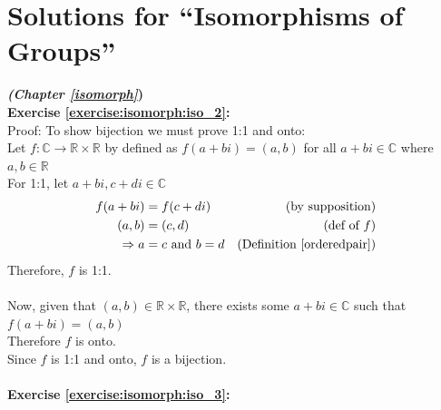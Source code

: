 
\section{Solutions for ``Isomorphisms of Groups''}
\noindent\textbf{\textit{ (Chapter \ref{isomorph}})}\bigskip
\\
\textbf{Exercise \ref{exercise:isomorph:iso_2}:}
\\
Proof: To show bijection we must prove 1:1 and onto:
\\
Let $f : {\mathbb C} \longrightarrow {\mathbb R} \times {\mathbb R}$ by defined as $f(a + bi) = (a,b)$ for all $a +  bi \in {\mathbb C}$ where $a, b \in {\mathbb R}$
\\
For 1:1, let $a + bi, c + di \in {\mathbb C}$
\begin{align*}
f(a + bi) &= f(c + di) &\text{(by supposition)}
\\
(a, b) &= (c, d) &\text{(def of\ } f)
\\
\implies a &= c \text{\ and\ } b = d &(\text{Definition~\ref{orderedpair}})
\end{align*}
Therefore, $f$ is 1:1.
\\
\\
Now, given that $(a, b) \in {\mathbb R} \times {\mathbb R}$, there exists some $a + bi \in {\mathbb C}$ such that $f(a + bi) = (a, b)$
\\
Therefore $f$ is onto.
\\
Since $f$ is 1:1 and onto, $f$ is a bijection.
\\
\\

\noindent\textbf{Exercise \ref{exercise:isomorph:iso_3}:}
\\
\begin{figure}[H]
\end{figure}

